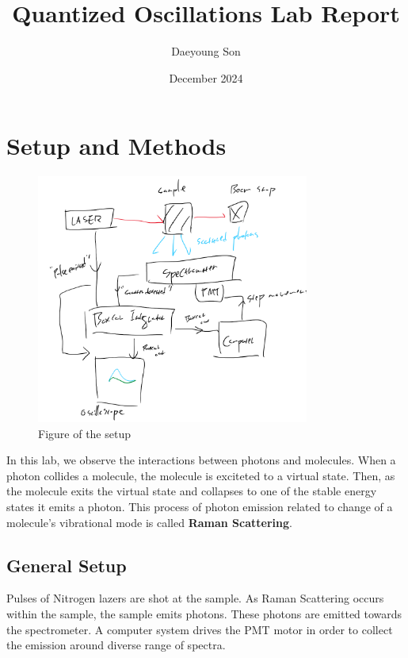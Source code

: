 \documentclass[10pt]{article}
\title{Quantized Oscillations Lab Report}
\author{Daeyoung Son}
\date{December 2024}
\numberwithin{equation}{section}
\numberwithin{theorem}{section}
\numberwithin{proposition}{section}
\numberwithin{lemma}{section}
\numberwithin{corollary}{section}
\numberwithin{remark}{section}
\numberwithin{definition}{section}
\numberwithin{example}{section}
\numberwithin{conjecture}{section}
\numberwithin{question}{section}
\begin{document}
\maketitle



\section{Setup and Methods}

\begin{figure}[htp]
    \centering
    \includegraphics[width=0.8\textwidth]{setupFig.png} %
    \caption{Figure of the setup}
    \label{fig:example}
\end{figure}


    In this lab, we observe the interactions between 
    photons and molecules. When a photon collides a molecule, 
    the molecule is exciteted to a virtual state. Then, as the 
    molecule exits the virtual state and collapses to one of the 
    stable energy states it emits a photon. This process of 
    photon emission related to change of a molecule's vibrational mode 
    is called \textbf{Raman Scattering}. 

\subsection{General Setup}

Pulses of Nitrogen lazers are shot at the sample. As Raman Scattering 
occurs within the sample, the sample emits photons. These photons are 
emitted towards the spectrometer. A computer system drives the PMT 
motor in order to collect the emission around diverse range of spectra. 
\end{document}
